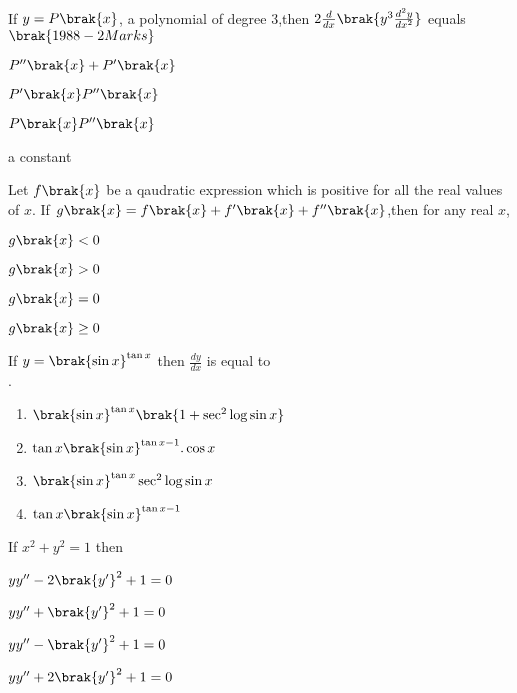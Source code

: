 \iffalse
  \title{Assignment}
  \author{Kotha Pratheek Reddy}
  \section{mcq-single}
\fi
    \item If $y=P\brak{x}$, a polynomial of degree 3,then $2\frac{d}{dx}\brak{y^3\frac{d^2y}{dx^2}}$ equals
    $\hfill\brak{1988-2 Marks}$
\begin{enumerate}
\begin{multicols}{2}
    \item $P^{\prime\prime}\brak{x}+P^{\prime}\brak{x}$
    \item $P^{\prime}\brak{x}P^{\prime\prime}\brak{x}$
    \item $P\brak{x}P^{\prime\prime}\brak{x}$
    \item a constant
 \end{multicols}   
\end{enumerate}
\item Let $f\brak{x}$ be a qaudratic expression which is positive for all the real values of $x$. If $g\brak{x} = f\brak{x}+f^{\prime}\brak{x}+f^{\prime\prime}\brak{x}$,then for any real $x$,
\begin{enumerate}
\begin{multicols}{2}
    \item $g\brak{x}<0$
    \item $g\brak{x}>0$
    \item $g\brak{x}=0$
    \item $g\brak{x}\geq0$
\end{multicols}
\end{enumerate}
\item If $y=\brak{\sin{x}}^{\tan{x}}$ then $\frac{dy}{dx}$ is equal to \\.\hfill{}
\begin{enumerate}
    \item $\brak{\sin{x}}^{\tan{x}}\brak{1+\sec^2{\log{\sin{x}}}}$
    \item $\tan{x}\brak{\sin{x}}^{\tan{x}-1}.\cos{x}$
    \item $\brak{\sin{x}}^{\tan{x}}\sec^2{\log{\sin{x}}}$
    \item $\tan{x}\brak{\sin{x}}^{\tan{x}-1}$
\end{enumerate}
\item If $x^2+y^2=1$ then \hfill{}
\begin{enumerate}
\begin{multicols}{2}
    \item $yy^{\prime\prime}-2\brak{y^{\prime}}^2+1=0$
    \item $yy^{\prime\prime}+\brak{y^{\prime}}^2+1=0$
    \item $yy^{\prime\prime}-\brak{y^{\prime}}^2+1=0$
    \item $yy^{\prime\prime}+2\brak{y^{\prime}}^2+1=0$
    \end{multicols}
\end{enumerate}
